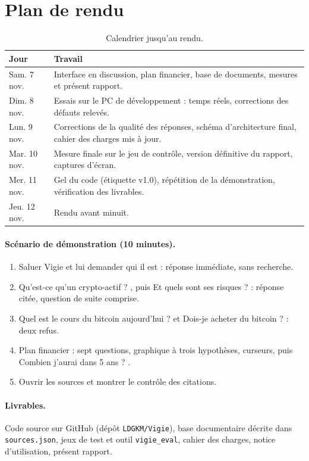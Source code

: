 \documentclass[11pt,a4paper]{article}
\begin{document}
\section{Plan de rendu}

\begin{table}[h]
\centering
\small
\begin{tabularx}{\linewidth}{@{}l X@{}}
\toprule
Jour & Travail \\
\midrule
Sam. 7 nov. & Interface en discussion, plan financier, base de \docsFinal{} documents, mesures et présent rapport. \\
Dim. 8 nov. & Essais sur le PC de développement : temps réels, corrections des défauts relevés. \\
Lun. 9 nov. & Corrections de la qualité des réponses, schéma d'architecture final, cahier des charges mis à jour. \\
Mar. 10 nov. & Mesure finale sur le jeu de contrôle, version définitive du rapport, captures d'écran. \\
Mer. 11 nov. & Gel du code (étiquette v1.0), répétition de la démonstration, vérification des livrables. \\
Jeu. 12 nov. & Rendu avant minuit. \\
\bottomrule
\end{tabularx}
\caption{Calendrier jusqu'au rendu.}
\end{table}

\paragraph{Scénario de démonstration (10 minutes).}
\begin{enumerate}
  \item Saluer Vigie et lui demander qui il est : réponse immédiate, sans recherche.
  \item \og Qu'est-ce qu'un crypto-actif ? \fg, puis \og Et quels sont ses risques ? \fg : réponse citée, question de suite comprise.
  \item \og Quel est le cours du bitcoin aujourd'hui ? \fg{} et \og Dois-je acheter du bitcoin ? \fg : deux refus.
  \item Plan financier : sept questions, graphique à trois hypothèses, curseurs, puis \og Combien j'aurai dans 5 ans ? \fg.
  \item Ouvrir les sources et montrer le contrôle des citations.
\end{enumerate}

\paragraph{Livrables.} Code source sur GitHub (dépôt \texttt{LDGKM/Vigie}), base documentaire décrite dans \texttt{sources.json}, jeux de test et outil \texttt{vigie\_eval}, cahier des charges, notice d'utilisation, présent rapport.
\end{document}
